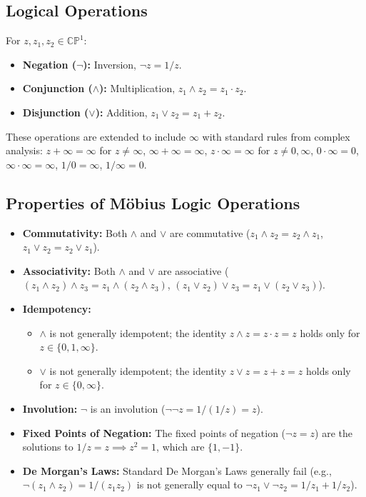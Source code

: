 \documentclass{article}
\begin{document}
	\subsection{Logical Operations}
	For $z, z_1, z_2 \in \mathbb{CP}^1$:
	\begin{itemize}
		\item \textbf{Negation ($\neg$):} Inversion, $\neg z = 1/z$.
		\item \textbf{Conjunction ($\wedge$):} Multiplication, $z_1 \wedge z_2 = z_1 \cdot z_2$.
		\item \textbf{Disjunction ($\vee$):} Addition, $z_1 \vee z_2 = z_1 + z_2$.
	\end{itemize}
	These operations are extended to include $\infty$ with standard rules from complex analysis: $z+\infty = \infty$ for $z \neq \infty$, $\infty+\infty=\infty$, $z \cdot \infty = \infty$ for $z \neq 0, \infty$, $0 \cdot \infty = 0$, $\infty \cdot \infty = \infty$, $1/0 = \infty$, $1/\infty = 0$.
	
	\subsection{Properties of Möbius Logic Operations}
	\begin{itemize}
		\item \textbf{Commutativity:} Both \(\wedge\) and \(\vee\) are commutative (\(z_1 \wedge z_2 = z_2 \wedge z_1\), \(z_1 \vee z_2 = z_2 \vee z_1\)).
		\item \textbf{Associativity:} Both \(\wedge\) and \(\vee\) are associative (\((z_1 \wedge z_2) \wedge z_3 = z_1 \wedge (z_2 \wedge z_3)\), \((z_1 \vee z_2) \vee z_3 = z_1 \vee (z_2 \vee z_3)\)).
		\item \textbf{Idempotency:}
		\begin{itemize}
			\item \(\wedge\) is not generally idempotent; the identity \(z \wedge z = z \cdot z = z\) holds only for \(z \in \{0, 1, \infty\}\).
			\item \(\vee\) is not generally idempotent; the identity \(z \vee z = z + z = z\) holds only for \(z \in \{0, \infty\}\).
		\end{itemize}
		\item \textbf{Involution:} \(\neg\) is an involution (\(\neg \neg z = 1/(1/z) = z\)).
		\item \textbf{Fixed Points of Negation:} The fixed points of negation (\(\neg z = z\)) are the solutions to \(1/z = z \implies z^2 = 1\), which are \(\{1, -1\}\).
		\item \textbf{De Morgan's Laws:} Standard De Morgan's Laws generally fail (e.g., \(\neg(z_1 \wedge z_2) = 1/(z_1 z_2)\) is not generally equal to \(\neg z_1 \vee \neg z_2 = 1/z_1 + 1/z_2\)).
	\end{itemize}
	
\end{document}
